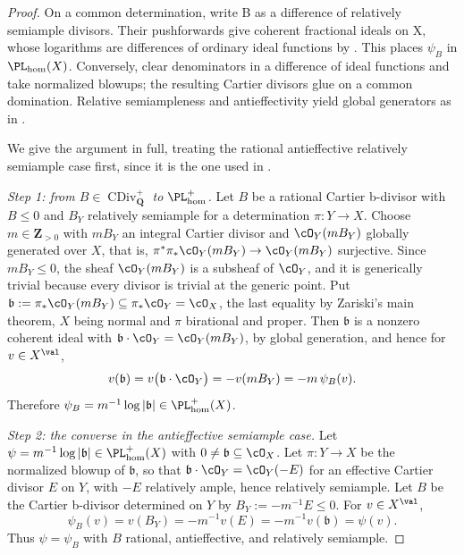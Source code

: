 \begin{proof}
On a common determination, write B as a difference of relatively
semiample divisors. Their pushforwards give coherent fractional ideals on X,
whose logarithms are differences of ordinary ideal functions by
\cite[Example~6.4]{BJ22}.  This
places $\psi_B$ in $\PL_{\mathrm{hom}}(X)$.  Conversely, clear
denominators in a difference of ideal functions and take normalized blowups;
the resulting Cartier divisors glue on a common domination.  Relative
semiampleness and antieffectivity yield global generators as in
.

We give the argument in full, treating the rational antieffective
relatively semiample case first, since it is the one used in
.

\medskip
\noindent\emph{Step 1: from $B\in\operatorname{CDiv}^+_{\mathbf Q}$ to
$\PL^+_{\mathrm{hom}}$.}
Let $B$ be a rational Cartier b-divisor with
$B\leq0$ and $B_Y$ relatively semiample for a determination
$\pi:Y\to X$.  Choose $m\in\mathbf Z_{>0}$ with $mB_Y$ an integral
Cartier divisor and $\cO_Y(mB_Y)$ globally generated over $X$, that is,
$\pi^*\pi_*\cO_Y(mB_Y)\to\cO_Y(mB_Y)$ surjective.  Since
$mB_Y\leq0$, the sheaf $\cO_Y(mB_Y)$ is a subsheaf of $\cO_Y$, and it
is generically trivial because every divisor is trivial at the generic
point.  Put
$\mathfrak b:=\pi_*\cO_Y(mB_Y)\subseteq\pi_*\cO_Y=\cO_X$, the last
equality by Zariski's main theorem, $X$ being normal and $\pi$
birational and proper.  Then $\mathfrak b$ is a nonzero coherent ideal
with $\mathfrak b\cdot\cO_Y=\cO_Y(mB_Y)$, by global generation, and hence
for $v\in X^{\val}$,
\[
 v(\mathfrak b)=v\bigl(\mathfrak b\cdot\cO_Y\bigr)=-v(mB_Y)=-m\,\psi_B(v).
\]
Therefore $\psi_B=m^{-1}\log|\mathfrak b|\in\PL^+_{\mathrm{hom}}(X)$.

\medskip
\noindent\emph{Step 2: the converse in the antieffective semiample case.}
Let $\psi=m^{-1}\log|\mathfrak b|\in\PL^+_{\mathrm{hom}}(X)$ with
$0\neq\mathfrak b\subseteq\cO_X$.  Let $\pi:Y\to X$ be the normalized
blowup of $\mathfrak b$, so that
$\mathfrak b\cdot\cO_Y=\cO_Y(-E)$ for an effective Cartier divisor $E$
on $Y$, with $-E$ relatively ample, hence relatively semiample.  Let
$B$ be the Cartier b-divisor determined on $Y$ by
$B_Y:=-m^{-1}E\leq0$.  For $v\in X^{\val}$,
\[
 \psi_B(v)=v(B_Y)=-m^{-1}v(E)=-m^{-1}v(\mathfrak b)=\psi(v).
\]
Thus $\psi=\psi_B$ with $B$ rational, antieffective, and relatively
semiample.


\end{proof}
